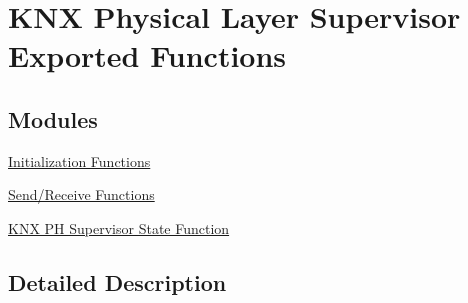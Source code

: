 \hypertarget{group___k_n_x___p_h___sup___exported___functions}{}\section{K\+NX Physical Layer Supervisor Exported Functions}
\label{group___k_n_x___p_h___sup___exported___functions}
\subsection*{Modules}
\begin{DoxyCompactItemize}
\item 
\hyperlink{group___k_n_x___p_h___sup___exported___functions___group1}{Initialization Functions}
\item 
\hyperlink{group___k_n_x___p_h___sup___exported___functions___group2}{Send/\+Receive Functions}
\item 
\hyperlink{group___k_n_x___p_h___sup___exported___functions___group3}{K\+N\+X P\+H Supervisor State Function}
\end{DoxyCompactItemize}


\subsection{Detailed Description}
